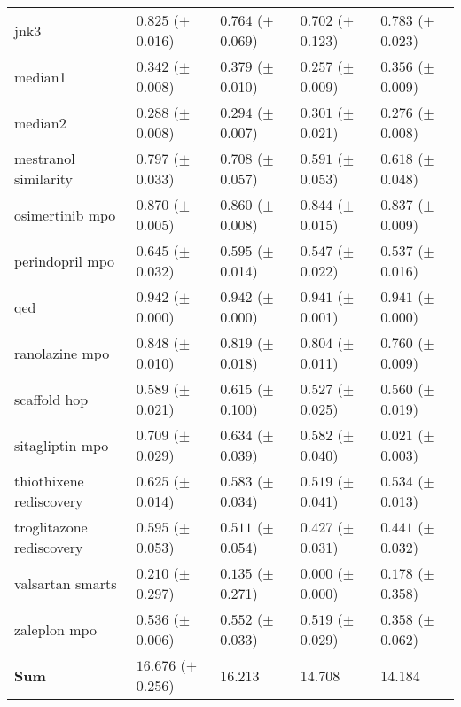 \begin{table}[ht]
\begin{tabularx}{\linewidth}{l|>{}p{2.2cm} Y Y Y }
\small{jnk3} & $\mathbf{0.825}$ {\tiny ($\pm$ 0.016)} & $0.764$ {\tiny ($\pm$ 0.069)} & $0.702$ {\tiny ($\pm$ 0.123)} & $0.783$ {\tiny ($\pm$ 0.023)} \\
\small{median1} & $0.342$ {\tiny ($\pm$ 0.008)} & $\mathbf{0.379}$ {\tiny ($\pm$ 0.010)} & $0.257$ {\tiny ($\pm$ 0.009)} & $0.356$ {\tiny ($\pm$ 0.009)} \\
\small{median2} & $\mathbf{0.288}$ {\tiny ($\pm$ 0.008)} & $\mathbf{0.294}$ {\tiny ($\pm$ 0.007)} & $\mathbf{0.301}$ {\tiny ($\pm$ 0.021)} & $0.276$ {\tiny ($\pm$ 0.008)} \\
\small{mestranol similarity} & $\mathbf{0.797}$ {\tiny ($\pm$ 0.033)} & $0.708$ {\tiny ($\pm$ 0.057)} & $0.591$ {\tiny ($\pm$ 0.053)} & $0.618$ {\tiny ($\pm$ 0.048)} \\
\small{osimertinib mpo} & $\mathbf{0.870}$ {\tiny ($\pm$ 0.005)} & $0.860$ {\tiny ($\pm$ 0.008)} & $0.844$ {\tiny ($\pm$ 0.015)} & $0.837$ {\tiny ($\pm$ 0.009)} \\
\small{perindopril mpo} & $\mathbf{0.645}$ {\tiny ($\pm$ 0.032)} & $0.595$ {\tiny ($\pm$ 0.014)} & $0.547$ {\tiny ($\pm$ 0.022)} & $0.537$ {\tiny ($\pm$ 0.016)} \\
\small{qed} & $\mathbf{0.942}$ {\tiny ($\pm$ 0.000)} & $\mathbf{0.942}$ {\tiny ($\pm$ 0.000)} & $0.941$ {\tiny ($\pm$ 0.001)} & $0.941$ {\tiny ($\pm$ 0.000)} \\
\small{ranolazine mpo} & $\mathbf{0.848}$ {\tiny ($\pm$ 0.010)} & $0.819$ {\tiny ($\pm$ 0.018)} & $0.804$ {\tiny ($\pm$ 0.011)} & $0.760$ {\tiny ($\pm$ 0.009)} \\
\small{scaffold hop} & $\mathbf{0.589}$ {\tiny ($\pm$ 0.021)} & $\mathbf{0.615}$ {\tiny ($\pm$ 0.100)} & $\mathbf{0.527}$ {\tiny ($\pm$ 0.025)} & $\mathbf{0.560}$ {\tiny ($\pm$ 0.019)} \\
\small{sitagliptin mpo} & $\mathbf{0.709}$ {\tiny ($\pm$ 0.029)} & $0.634$ {\tiny ($\pm$ 0.039)} & $0.582$ {\tiny ($\pm$ 0.040)} & $0.021$ {\tiny ($\pm$ 0.003)} \\
\small{thiothixene rediscovery} & $\mathbf{0.625}$ {\tiny ($\pm$ 0.014)} & $0.583$ {\tiny ($\pm$ 0.034)} & $0.519$ {\tiny ($\pm$ 0.041)} & $0.534$ {\tiny ($\pm$ 0.013)} \\
\small{troglitazone rediscovery} & $\mathbf{0.595}$ {\tiny ($\pm$ 0.053)} & $0.511$ {\tiny ($\pm$ 0.054)} & $0.427$ {\tiny ($\pm$ 0.031)} & $0.441$ {\tiny ($\pm$ 0.032)} \\
\small{valsartan smarts} & $\mathbf{0.210}$ {\tiny ($\pm$ 0.297)} & $\mathbf{0.135}$ {\tiny ($\pm$ 0.271)} & $\mathbf{0.000}$ {\tiny ($\pm$ 0.000)} & $\mathbf{0.178}$ {\tiny ($\pm$ 0.358)} \\
\small{zaleplon mpo} & $\mathbf{0.536}$ {\tiny ($\pm$ 0.006)} & $\mathbf{0.552}$ {\tiny ($\pm$ 0.033)} & $\mathbf{0.519}$ {\tiny ($\pm$ 0.029)} & $0.358$ {\tiny ($\pm$ 0.062)} \\
\midrule
\textbf{Sum} & $\mathbf{16.676}$ {\tiny ($\pm$ 0.256)} & 16.213 & 14.708 & 14.184 \\
\bottomrule
\end{tabularx}
\end{table}